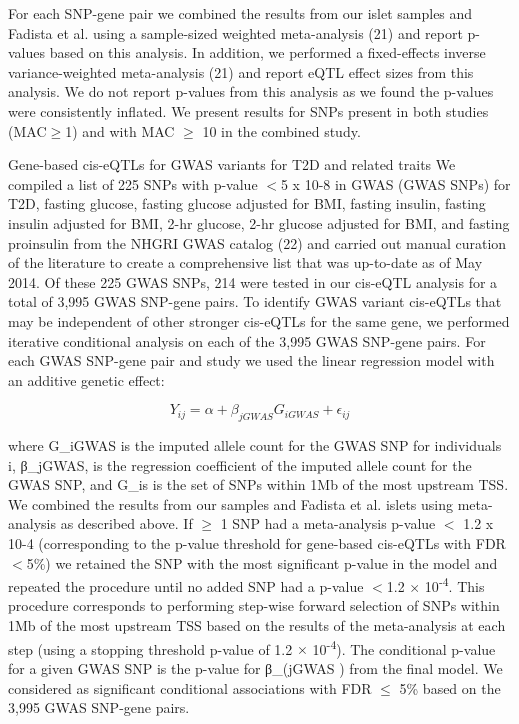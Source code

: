 For each SNP-gene pair we combined the results from our islet samples and Fadista et al. using a sample-sized weighted meta-analysis (21) and report p-values based on this analysis. In addition, we performed a fixed-effects inverse variance-weighted meta-analysis (21) and report eQTL effect sizes from this analysis. We do not report p-values from this analysis as we found the p-values were consistently inflated. We present results for SNPs present in both studies (MAC$\geq$1) and with MAC $\geq$ 10 in the combined study.
 
Gene-based cis-eQTLs for GWAS variants for T2D and related traits
We compiled a list of 225 SNPs with p-value $<$5 x 10-8 in GWAS (GWAS SNPs) for T2D, fasting glucose, fasting glucose adjusted for BMI, fasting insulin, fasting insulin adjusted for BMI, 2-hr glucose, 2-hr glucose adjusted for BMI, and fasting proinsulin from the NHGRI GWAS catalog (22) and carried out manual curation of the literature to create a comprehensive list that was up-to-date as of May 2014. Of these 225 GWAS SNPs, 214 were tested in our cis-eQTL analysis for a total of 3,995 GWAS SNP-gene pairs. To identify GWAS variant cis-eQTLs that may be independent of other stronger cis-eQTLs for the same gene, we performed iterative conditional analysis on each of the 3,995 GWAS SNP-gene pairs. For each GWAS SNP-gene pair and study we used the linear regression model with an additive genetic effect:

\[Y_{ij} = \alpha + \beta_{jGWAS}G_{iGWAS} + \epsilon_{ij} \]


where G_iGWAS is the imputed allele count for the GWAS SNP for individuals i, β_jGWAS, is the regression coefficient of the imputed allele count for the GWAS SNP, and G_is is the set of SNPs within 1Mb of the most upstream TSS. We combined the results from our samples and Fadista et al. islets using meta-analysis as described above.  If $\geq$ 1 SNP had a meta-analysis p-value $<$ 1.2 x 10-4 (corresponding to the p-value threshold for gene-based cis-eQTLs with FDR $<$5\%) we retained the SNP with the most significant p-value in the model and repeated the procedure until no added SNP had a p-value $<$1.2 $\times$ 10\textsuperscript{-4}. This procedure corresponds to performing step-wise forward selection of SNPs within 1Mb of the most upstream TSS based on the results of the meta-analysis at each step (using a stopping threshold p-value of 1.2 $\times$ 10\textsuperscript{-4}). The conditional p-value for a given GWAS SNP is the p-value for β_(jGWAS ) from the final model. We considered as significant conditional associations with FDR $\leq$ 5\% based on the 3,995 GWAS SNP-gene pairs.

